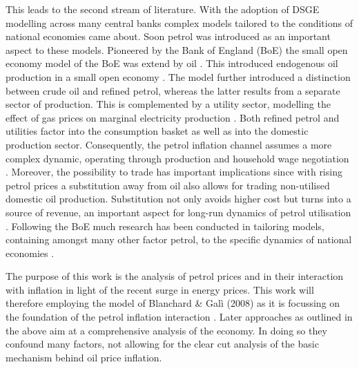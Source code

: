 \documentclass[12pt,a4paper,english]{article} %
\begin{document}
	This leads to the second stream of literature. With the adoption of DSGE modelling across many central banks complex models tailored to the conditions of national economies came about. Soon petrol was introduced as an important aspect to these models. Pioneered by the Bank of England (BoE) the small open economy model of the BoE was extend by oil \cite{harrison_evaluating_2010, harrison_impact_2011}. This introduced endogenous oil production in a small open economy \cite{harrison_impact_2011}. The model further introduced a distinction between crude oil and refined petrol, whereas the latter results from a separate sector of production. This is complemented by a utility sector, modelling the effect of gas prices on marginal electricity production \cite{harrison_impact_2011}. Both refined petrol and utilities factor into the consumption basket as well as into the domestic production sector. Consequently, the petrol inflation channel assumes a more complex dynamic, operating through production and household wage negotiation \cite{harrison_impact_2011}. Moreover, the possibility to trade has important implications since with rising petrol prices a substitution away from oil also allows for trading non-utilised domestic oil production. Substitution not only avoids higher cost but turns into a source of revenue, an important aspect for long-run dynamics of petrol utilisation \cite{harrison_impact_2011}. Following the BoE much research has been conducted in tailoring models, containing amongst many other factor petrol, to the specific dynamics of national economies \cite{lees_introducing_2009, malakhovskaya_are_2014, hou_oil_2016}. 
	
	
	The purpose of this work is the analysis of petrol prices and in their interaction with inflation in light of the recent surge in energy prices. This work will therefore employing the model of Blanchard \& Galì (2008) as it is focussing on the foundation of the petrol inflation interaction \cite{blanchard_macroeconomic_2007}. Later approaches as outlined in the above aim at a comprehensive analysis of the economy. In doing so they confound many factors, not allowing for the clear cut analysis of the basic mechanism behind oil price inflation.
	
\end{document}
